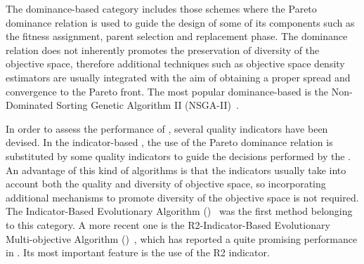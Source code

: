The dominance-based category includes those schemes where the Pareto dominance relation is used to guide the 
design of some of its components such as the fitness assignment, parent selection and replacement phase.
%
The dominance relation does not inherently promotes the preservation of diversity of the objective space, 
therefore additional techniques such as objective space density estimators are usually integrated with the aim
of obtaining a proper spread and convergence to the Pareto front.
%
%
The most popular dominance-based \MOEA{} is the Non-Dominated Sorting Genetic Algorithm II (NSGA-II)~\cite{Joel:NSGAII}.
%

In order to assess the performance of \MOEAS{}, several quality indicators have been devised.
%
In the indicator-based \MOEAS{}, the use of the Pareto dominance relation is substituted by some quality indicators 
to guide the decisions performed by the \MOEA{}.
%
An advantage of this kind of algorithms is that the indicators usually take into account both the quality and 
diversity of objective space, so incorporating additional mechanisms to promote diversity of the objective 
space is not required.
%
%
The Indicator-Based Evolutionary Algorithm (\IBEA{})~\cite{Joel:IBEA} was the first method belonging to this category.
%
A more recent one is the R2-Indicator-Based Evolutionary Multi-objective Algorithm (\RMOEA{})~\cite{trautmann2013r2}, 
which has reported a quite promising performance in \MOPS{}.
%
%
%
Its most important feature is the use of the R2 indicator.
%

